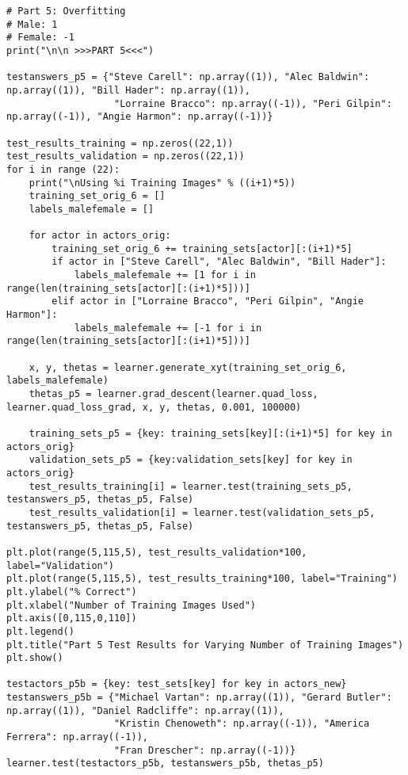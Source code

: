 \documentclass[11pt,a4paper]{report}
\begin{document}
\begin{lstlisting}
# Part 5: Overfitting
# Male: 1
# Female: -1
print("\n\n >>>PART 5<<<")

testanswers_p5 = {"Steve Carell": np.array((1)), "Alec Baldwin": np.array((1)), "Bill Hader": np.array((1)),
                   "Lorraine Bracco": np.array((-1)), "Peri Gilpin": np.array((-1)), "Angie Harmon": np.array((-1))}

test_results_training = np.zeros((22,1))
test_results_validation = np.zeros((22,1))
for i in range (22):
    print("\nUsing %i Training Images" % ((i+1)*5))
    training_set_orig_6 = []
    labels_malefemale = []

    for actor in actors_orig:
        training_set_orig_6 += training_sets[actor][:(i+1)*5]
        if actor in ["Steve Carell", "Alec Baldwin", "Bill Hader"]:
            labels_malefemale += [1 for i in range(len(training_sets[actor][:(i+1)*5]))]
        elif actor in ["Lorraine Bracco", "Peri Gilpin", "Angie Harmon"]:
            labels_malefemale += [-1 for i in range(len(training_sets[actor][:(i+1)*5]))]

    x, y, thetas = learner.generate_xyt(training_set_orig_6, labels_malefemale)
    thetas_p5 = learner.grad_descent(learner.quad_loss, learner.quad_loss_grad, x, y, thetas, 0.001, 100000)

    training_sets_p5 = {key: training_sets[key][:(i+1)*5] for key in actors_orig}
    validation_sets_p5 = {key:validation_sets[key] for key in actors_orig}
    test_results_training[i] = learner.test(training_sets_p5, testanswers_p5, thetas_p5, False)
    test_results_validation[i] = learner.test(validation_sets_p5, testanswers_p5, thetas_p5, False)

plt.plot(range(5,115,5), test_results_validation*100, label="Validation")
plt.plot(range(5,115,5), test_results_training*100, label="Training")
plt.ylabel("% Correct")
plt.xlabel("Number of Training Images Used")
plt.axis([0,115,0,110])
plt.legend()
plt.title("Part 5 Test Results for Varying Number of Training Images")
plt.show()

testactors_p5b = {key: test_sets[key] for key in actors_new}
testanswers_p5b = {"Michael Vartan": np.array((1)), "Gerard Butler": np.array((1)), "Daniel Radcliffe": np.array((1)),
                   "Kristin Chenoweth": np.array((-1)), "America Ferrera": np.array((-1)),
                   "Fran Drescher": np.array((-1))}
learner.test(testactors_p5b, testanswers_p5b, thetas_p5)
\end{lstlisting}
\end{document}
